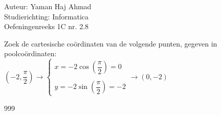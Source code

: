 \documentclass[a4paper]{article}
\begin{document}
\noindent \large Auteur: Yaman Haj Ahmad \\
\noindent \large Studierichting: Informatica\\
\noindent \large Oefeningenreeks 1C nr. 2.8\\

\medskip

\normalsize

Zoek de cartesische coördinaten van de volgende punten, gegeven in poolcoördinaten: \\

$\left(-2, \dfrac{\pi}{2}\right) \rightarrow \left\{
    \begin{array}{l}
        x = -2\cos\left(\dfrac{\pi}{2} \right) = 0\\\\
        y = -2\sin\left(\dfrac{\pi}{2} \right) = -2
    \end{array}
\right. \rightarrow \left(0, -2\right)$

\begin{thebibliography}{999}
\end{thebibliography}
\end{document}
